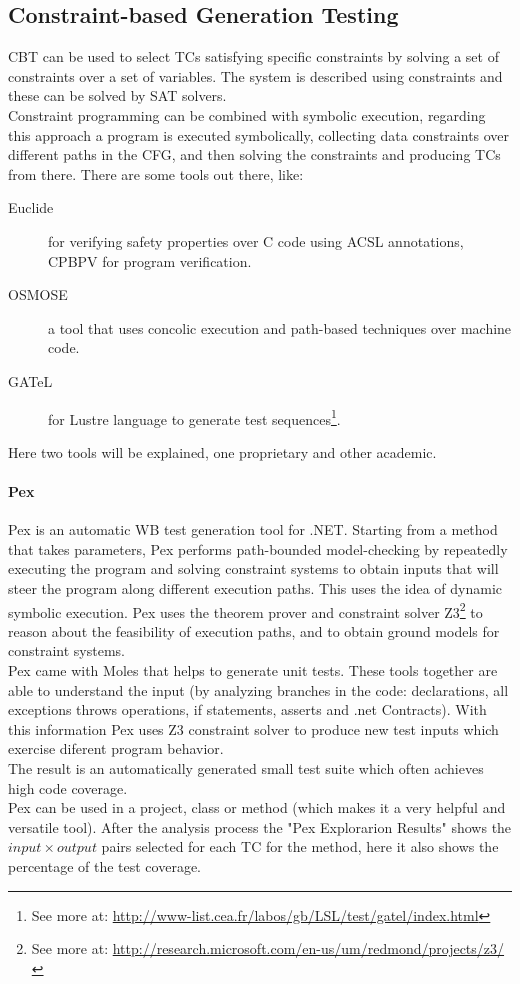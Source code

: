 \subsection{Constraint-based Generation Testing}
\ac{CBT}\cite{DeMillo91constraint-basedautomatic} can be used to select \ac{TC}s satisfying specific constraints by
solving a set of constraints over a set of variables. The system is described using constraints and these can be solved by \ac{SAT} solvers.\\
Constraint programming can be combined with symbolic execution, regarding this approach a program is executed symbolically,
collecting data constraints over different paths in the \ac{CFG}, and then solving the constraints and producing \ac{TC}s from there.
There are some tools out there, like:

\begin{description}
\item[Euclide] for verifying safety properties over C code using \ac{ACSL} annotations, CPBPV for program verification.
\item[OSMOSE] a tool that uses concolic execution and path-based techniques over machine code.
\item[GATeL] for Lustre language to generate test sequences\footnote{See more at: \url{http://www-list.cea.fr/labos/gb/LSL/test/gatel/index.html}}.
\end{description}

Here two tools will be explained, one proprietary and other academic.

\paragraph{Pex} Pex\cite{Tillmann:2008:PWB:1792786.1792798} is an automatic \ac{WB} test generation tool for .NET. Starting from a
method that takes parameters, Pex performs path-bounded model-checking
by repeatedly executing the program and solving constraint systems to obtain inputs that will steer the program along different execution paths.
This uses the idea of dynamic symbolic execution\cite{Tillmann06unittests}. Pex uses the theorem prover and
constraint solver Z3\footnote{See more at: \url{http://research.microsoft.com/en-us/um/redmond/projects/z3/}} to reason about the feasibility of execution paths, and
to obtain ground models for constraint systems.\\
Pex came with Moles that helps to generate unit tests. These tools together are able to understand the input (by analyzing branches in the code:
declarations, all exceptions throws operations, if statements, asserts and .net Contracts). With this information Pex uses Z3 constraint solver to
produce new test inputs which exercise diferent program behavior.\\
The result is an automatically generated small test suite which often achieves high code coverage.\\
Pex can be used in a project, class or method (which makes it a very helpful and versatile tool). After the analysis process the "Pex Explorarion Results" shows
the $input \times output$ pairs selected for each \ac{TC} for the method, here it also shows the percentage of the test coverage.

